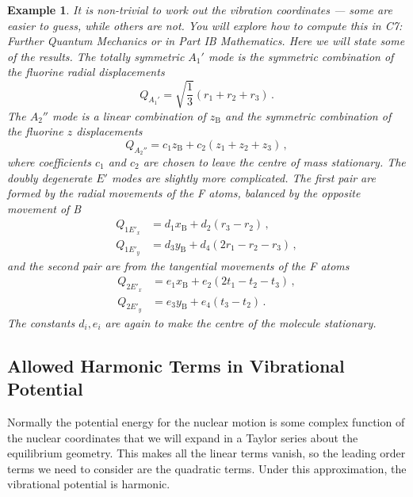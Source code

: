 \documentclass{article}
\theoremstyle{plain}\theoremheaderfont{\normalfont\itshape}\theorembodyfont{\rmfamily}\theoremseparator{.}\newtheorem*{rem}{Remark}\newtheorem*{ex}{Example}\newtheorem*{proof}{Proof}\newtheorem*{altp}{Alternative proof}
\theoremstyle{plain}\theoremheaderfont{\normalfont\bfseries}\theorembodyfont{\rmfamily}\theoremseparator{.}\newtheorem{thm}{Theorem}[section]\newtheorem{lem}[thm]{Lemma}\newtheorem{prop}[thm]{Proposition}\newtheorem*{cor}{Corollary}\newtheorem{defn}[thm]{Definition}\newtheorem{clm}[thm]{Claim}\newtheorem{clminproof}{Claim}\newtheorem*{law}{Law}\newtheorem{pos}[thm]{Postulate}
\theoremstyle{break}\theoremheaderfont{\normalfont\itshape}\theorembodyfont{\rmfamily}\theoremseparator{.\medskip}\newtheorem*{proofskip}{Proof}\newtheorem*{exs}{Examples}\newtheorem*{rems}{Remarks}
\theoremstyle{break}\theoremheaderfont{\normalfont\bfseries}\theorembodyfont{\rmfamily}\theoremseparator{.\medskip}\newtheorem{lemskip}[thm]{Lemma}\newtheorem{defnskip}[thm]{Definition}\newtheorem{propskip}[thm]{Proposition}\newtheorem{thmskip}[thm]{Theorem}
\numberwithin{equation}{section}
\begin{document}
\begin{ex}
        It is non-trivial to work out the vibration coordinates --- some are easier to guess, while others are not. You will explore how to compute this in \textit{C7: Further Quantum Mechanics} or in Part IB Mathematics. Here we will state some of the results. The totally symmetric \(A_1'\) mode is the symmetric combination of the fluorine radial displacements
        \begin{equation}
            Q_{A_1'}=\sqrt{\frac{1}{3}}(r_1+r_2+r_3)\,.
        \end{equation}
        The \(A_2''\) mode is a linear combination of \(z_{\mathrm{B}}\) and the symmetric combination of the fluorine \(z\) displacements
        \begin{equation}
            Q_{A_2''}=c_1 z_{\mathrm{B}}+c_2\left(z_1+z_2+z_3\right)\,,
        \end{equation}
        where coefficients \(c_1\) and \(c_2\) are chosen to leave the centre of mass stationary. The doubly degenerate \(E'\) modes are slightly more complicated. The first pair are formed by the radial movements of the F atoms, balanced by the opposite movement of B
        \begin{align}
            Q_{1E'_x}&=d_1 x_{\mathrm{B}}+d_2(r_3-r_2)\,, \\
            Q_{1E'_y}&=d_3 y_{\mathrm{B}}+d_4(2r_1-r_2-r_3)\,,
        \end{align}
        and the second pair are from the tangential movements of the F atoms
        \begin{align}
            Q_{2E'_x}&=e_1 x_{\mathrm{B}}+e_2(2t_1-t_2-t_3)\,, \\
            Q_{2E'_y}&=e_3 y_{\mathrm{B}}+e_4(t_3-t_2)\,.
        \end{align}
        The constants \(d_i,e_i\) are again to make the centre of the molecule stationary.
    \end{ex}

    \subsection{Allowed Harmonic Terms in Vibrational Potential}
    Normally the potential energy for the nuclear motion is some complex function of the nuclear coordinates that we will expand in a Taylor series about the equilibrium geometry. This makes all the linear terms vanish, so the leading order terms we need to consider are the quadratic terms. Under this approximation, the vibrational potential is harmonic.
\end{document}
